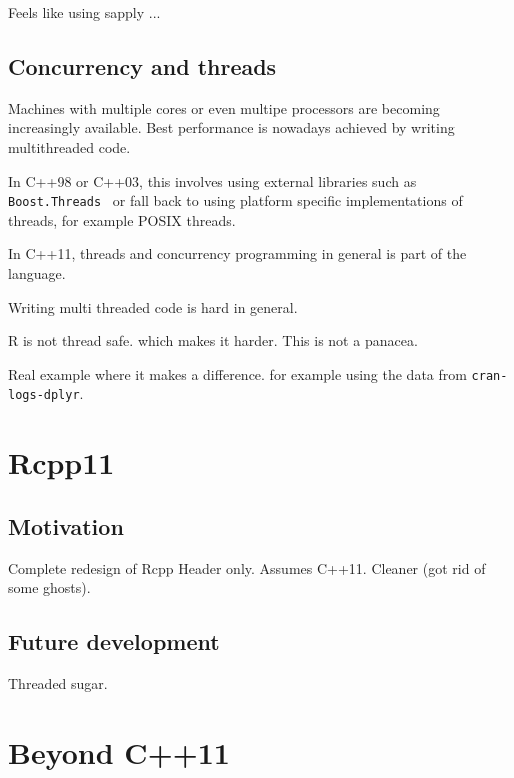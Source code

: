 Feels like using sapply ...

\subsection{Concurrency and threads}

Machines with multiple cores or even multipe 
processors are becoming increasingly available. Best performance 
is nowadays achieved by writing multithreaded code. 

In C++98 or C++03, this involves using external libraries 
such as \texttt{Boost.Threads}~\citep{KempfBoostThreads} 
or fall back to using platform specific 
implementations of threads, for example POSIX threads. 

In C++11, threads and concurrency programming in general is part of
the language. 

Writing multi threaded code is hard in general. 

R is not thread safe. which makes it harder. This is not a panacea. 

Real example where it makes a difference. for example using the 
data from \texttt{cran-logs-dplyr}. 

\section{Rcpp11}

\subsection{Motivation}

Complete redesign of Rcpp
Header only. Assumes C++11.
Cleaner (got rid of some ghosts). 

\subsection{Future development}

Threaded sugar. 

\section{Beyond C++11}



\address{Romain François\\
    R Enthusiasts\\
    1 place de l'égalité. 42400 Saint Chamond\\
    FRANCE }
    

